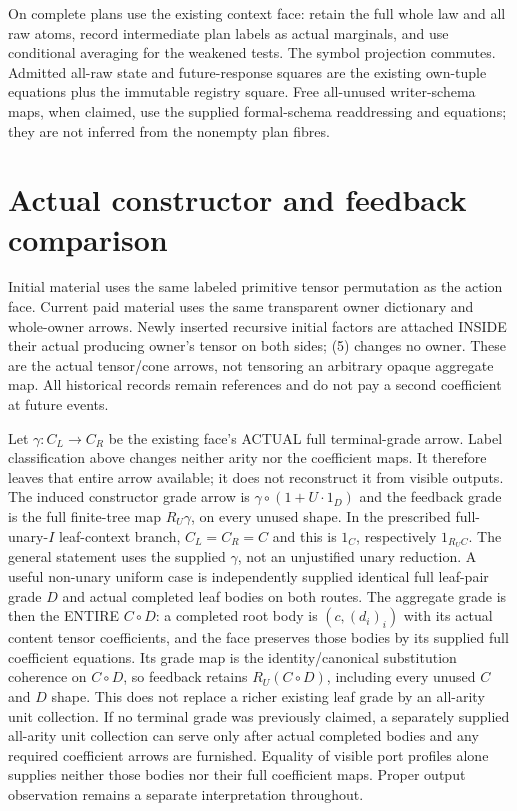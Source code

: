 \documentclass[11pt]{article}
\begin{document}
On complete plans use the existing context face: retain the full whole law and all raw atoms, record intermediate plan labels as actual marginals, and use conditional averaging for the weakened tests. The symbol projection commutes. Admitted all-raw state and future-response squares are the existing own-tuple equations plus the immutable registry square. Free all-unused writer-schema maps, when claimed, use the supplied formal-schema readdressing and equations; they are not inferred from the nonempty plan fibres.

\section{Actual constructor and feedback comparison}
Initial material uses the same labeled primitive tensor permutation as the action face. Current paid material uses the same transparent owner dictionary and whole-owner arrows. Newly inserted recursive initial factors are attached INSIDE their actual producing owner's tensor on both sides; (5) changes no owner. These are the actual tensor/cone arrows, not tensoring an arbitrary opaque aggregate map. All historical records remain references and do not pay a second coefficient at future events.

Let $\gamma:C_L\to C_R$ be the existing face's ACTUAL full terminal-grade arrow. Label classification above changes neither arity nor the coefficient maps. It therefore leaves that entire arrow available; it does not reconstruct it from visible outputs. The induced constructor grade arrow is $\gamma\circ(1+U\cdot1_D)$ and the feedback grade is the full finite-tree map $R_U\gamma$, on every unused shape. In the prescribed full-unary-$I$ leaf-context branch, $C_L=C_R=C$ and this is $1_C$, respectively $1_{R_UC}$. The general statement uses the supplied $\gamma$, not an unjustified unary reduction. A useful non-unary uniform case is independently supplied identical full leaf-pair grade $D$ and actual completed leaf bodies on both routes. The aggregate grade is then the ENTIRE $C\circ D$: a completed root body is $(c,(d_i)_i)$ with its actual content tensor coefficients, and the face preserves those bodies by its supplied full coefficient equations. Its grade map is the identity/canonical substitution coherence on $C\circ D$, so feedback retains $R_U(C\circ D)$, including every unused $C$ and $D$ shape. This does not replace a richer existing leaf grade by an all-arity unit collection. If no terminal grade was previously claimed, a separately supplied all-arity unit collection can serve only after actual completed bodies and any required coefficient arrows are furnished. Equality of visible port profiles alone supplies neither those bodies nor their full coefficient maps. Proper output observation remains a separate interpretation throughout.
\end{document}

